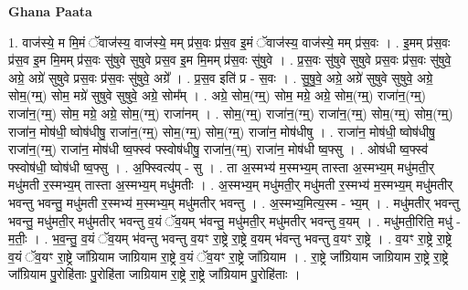 \documentclass[17pt]{extarticle}
\begin{document}
\textbf{Ghana Paata } \newline

1. वाज॑स्ये॒ म मि॒मं ॅवाज॑स्य॒ वाज॑स्ये॒ मम् प्र॑स॒वः प्र॑स॒व इ॒मं ॅवाज॑स्य॒ वाज॑स्ये॒ मम् प्र॑स॒वः । . इ॒मम् प्र॑स॒वः प्र॑स॒व इ॒म मि॒मम् प्र॑स॒वः सु॑षुवे सुषुवे प्रस॒व इ॒म मि॒मम् प्र॑स॒वः सु॑षुवे । . प्र॒स॒वः सु॑षुवे सुषुवे प्रस॒वः प्र॑स॒वः सु॑षुवे॒ अग्रे॒ अग्रे॑ सुषुवे प्रस॒वः प्र॑स॒वः सु॑षुवे॒ अग्रे᳚ । . प्र॒स॒व इति॑ प्र - स॒वः । . सु॒षु॒वे॒ अग्रे॒ अग्रे॑ सुषुवे सुषुवे॒ अग्रे॒ सोम॒(ग्म्॒) सोम॒ मग्रे॑ सुषुवे सुषुवे॒ अग्रे॒ सोम᳚म् । . अग्रे॒ सोम॒(ग्म्॒) सोम॒ मग्रे॒ अग्रे॒ सोम॒(ग्म्॒) राजा॑न॒(ग्म्॒) राजा॑न॒(ग्म्॒) सोम॒ मग्रे॒ अग्रे॒ सोम॒(ग्म्॒) राजा॑नम् । . सोम॒(ग्म्॒) राजा॑न॒(ग्म्॒) राजा॑न॒(ग्म्॒) सोम॒(ग्म्॒) सोम॒(ग्म्॒) राजा॑न॒ मोष॑धी॒ ष्वोष॑धीषु॒ राजा॑न॒(ग्म्॒) सोम॒(ग्म्॒) सोम॒(ग्म्॒) राजा॑न॒ मोष॑धीषु । . राजा॑न॒ मोष॑धी॒ ष्वोष॑धीषु॒ राजा॑न॒(ग्म्॒) राजा॑न॒ मोष॑धी ष्व॒फ्स्व॑ फ्स्वोष॑धीषु॒ राजा॑न॒(ग्म्॒) राजा॑न॒ मोष॑धी ष्व॒फ्सु । . ओष॑धी ष्व॒फ्स्व॑ फ्स्वोष॑धी॒ ष्वोष॑धी ष्व॒फ्सु । . अ॒फ्स्वित्य॑प् - सु । . ता अ॒स्मभ्य॑ म॒स्मभ्य॒म् तास्ता अ॒स्मभ्य॒म् मधु॑मती॒र् मधु॑मती र॒स्मभ्य॒म् तास्ता अ॒स्मभ्य॒म् मधु॑मतीः । . अ॒स्मभ्य॒म् मधु॑मती॒र् मधु॑मती र॒स्मभ्य॑ म॒स्मभ्य॒म् मधु॑मतीर् भवन्तु भवन्तु॒ मधु॑मती र॒स्मभ्य॑ म॒स्मभ्य॒म् मधु॑मतीर् भवन्तु । . अ॒स्मभ्य॒मित्य॒स्म - भ्य॒म् । . मधु॑मतीर् भवन्तु भवन्तु॒ मधु॑मती॒र् मधु॑मतीर् भवन्तु व॒यं ॅव॒यम् भ॑वन्तु॒ मधु॑मती॒र् मधु॑मतीर् भवन्तु व॒यम् । . मधु॑मती॒रिति॒ मधु॑ - म॒तीः॒ । . भ॒व॒न्तु॒ व॒यं ॅव॒यम् भ॑वन्तु भवन्तु व॒यꣳ रा॒ष्ट्रे रा॒ष्ट्रे व॒यम् भ॑वन्तु भवन्तु व॒यꣳ रा॒ष्ट्रे । . व॒यꣳ रा॒ष्ट्रे रा॒ष्ट्रे व॒यं ॅव॒यꣳ रा॒ष्ट्रे जा᳚ग्रियाम जाग्रियाम रा॒ष्ट्रे व॒यं ॅव॒यꣳ रा॒ष्ट्रे जा᳚ग्रियाम । . रा॒ष्ट्रे जा᳚ग्रियाम जाग्रियाम रा॒ष्ट्रे रा॒ष्ट्रे जा᳚ग्रियाम पु॒रोहि॑ताः पु॒रोहि॑ता जाग्रियाम रा॒ष्ट्रे रा॒ष्ट्रे जा᳚ग्रियाम पु॒रोहि॑ताः । \newline
\end{document}
